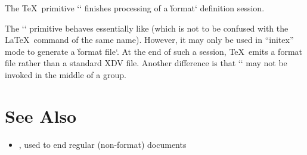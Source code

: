 
The \TeX\ primitive \tex`\dump` finishes processing of a \`format` definition
session.

The \tex`\dump` primitive behaves essentially like  (which is not to be
confused with the \LaTeX\ command of the same name). However, it may only be
used in “initex” mode to generate a \`format file`. At the end of such a session,
\TeX\ emits a format file rather than a standard XDV file. Another difference is
that \tex`\dump` may not be invoked in the middle of a group.

\section*{See Also}

\begin{itemize}
\item {}, used to end regular (non-format) documents
\end{itemize}
